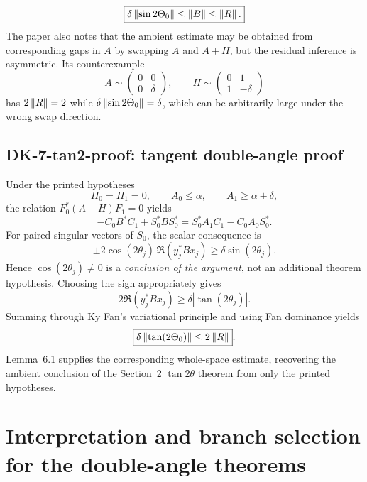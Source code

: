 \[
 \boxed{\delta\left\lVert \sin2\Theta_0\right\rVert\le\left\lVert B\right\rVert\le\left\lVert R\right\rVert.}
\]
The paper also notes that the ambient estimate may be obtained from corresponding gaps in $A$ by swapping $A$ and $A+H$, but the residual inference is asymmetric.  Its counterexample
\[
 A\sim\begin{pmatrix}0&0\\0&\delta\end{pmatrix},
 \qquad
 H\sim\begin{pmatrix}0&1\\1&-\delta\end{pmatrix}
\]
has $2\left\lVert R\right\rVert=2$ while $\delta\left\lVert \sin2\Theta_0\right\rVert=\delta$, which can be arbitrarily large under the wrong swap direction.

\subsection*{DK-7-tan2-proof: tangent double-angle proof}
Under the printed hypotheses
\[
 H_0=H_1=0,
 \qquad A_0\le\alpha,
 \qquad A_1\ge\alpha+\delta,
\]
the relation $F_0^*(A+H)F_1=0$ yields
\begin{equation}
 -C_0B^*C_1+S_0^*BS_0^*
 =S_0^*A_1C_1-C_0A_0S_0^*.
 \tag{7.6}
\end{equation}
For paired singular vectors of $S_0$, the scalar consequence is
\[
 \pm2\cos(2\theta_j)\,\Re(y_j^*Bx_j)
 \ge\delta\sin(2\theta_j).
\]
Hence $\cos(2\theta_j)\ne0$ is a \emph{conclusion of the argument}, not an additional theorem hypothesis.  Choosing the sign appropriately gives
\[
 2\Re(y_j^*Bx_j)\ge\delta|\tan(2\theta_j)|.
\]
Summing through Ky Fan's variational principle and using Fan dominance yields
\[
 \boxed{\delta\left\lVert \tan(2\Theta_0)\right\rVert\le2\left\lVert R\right\rVert}.
\]
Lemma~6.1 supplies the corresponding whole-space estimate, recovering the ambient conclusion of the Section~2 $\tan2\theta$ theorem from only the printed hypotheses.

\section{Interpretation and branch selection for the double-angle theorems}

